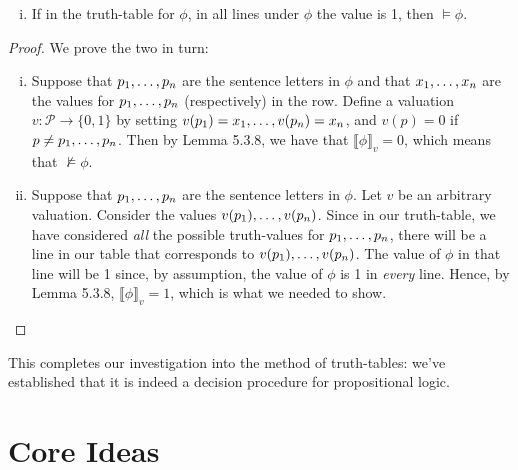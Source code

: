 \begin{enumerate}[\thesection.1]
\begin{theorem}
\begin{enumerate}[(i)]
			\item  If in the truth-table for $\phi$, in all lines under $\phi$ the value is 1, then $\vDash\phi$.
		
		\end{enumerate}
		
		
		\end{theorem}
	
	
	\begin{proof}
	We prove the two in turn:
	
		\begin{enumerate}[(i)]
		
			\item Suppose that $p_1, \mathellipsis, p_n$ are the sentence letters in $\phi$ and that $x_1, \mathellipsis, x_n$ are the values for $p_1, \mathellipsis, p_n$ (respectively) in the row. Define a valuation $v:\mathcal{P}\to\{0,1\}$ by setting $v(p_1)=x_1, \mathellipsis, v(p_n)=x_n$, and $v(p)=0$ if $p\neq p_1, \mathellipsis, p_n$. Then by Lemma 5.3.8, we have that $\llbracket \phi\rrbracket_v=0$, which means that $\nvDash\phi$.
			
			\item Suppose that $p_1, \mathellipsis, p_n$ are the sentence letters in $\phi$. Let $v$ be an arbitrary valuation. Consider the values $v(p_1), \mathellipsis, v(p_n)$. Since in our truth-table, we have considered \emph{all} the possible truth-values for $p_1, \mathellipsis, p_n$, there will be a line in our table that corresponds to $v(p_1), \mathellipsis, v(p_n)$. The value of $\phi$ in that line will be 1 since, by assumption, the value of $\phi$ is 1 in \emph{every} line. Hence, by  Lemma 5.3.8, $\llbracket \phi\rrbracket_v=1$, which is what we needed to show.


		\end{enumerate}
	
	\end{proof}	
	
	This completes our investigation into the method of truth-tables: we've established that it is indeed a decision procedure for propositional logic.

	\end{enumerate}

			
\section{Core Ideas}

